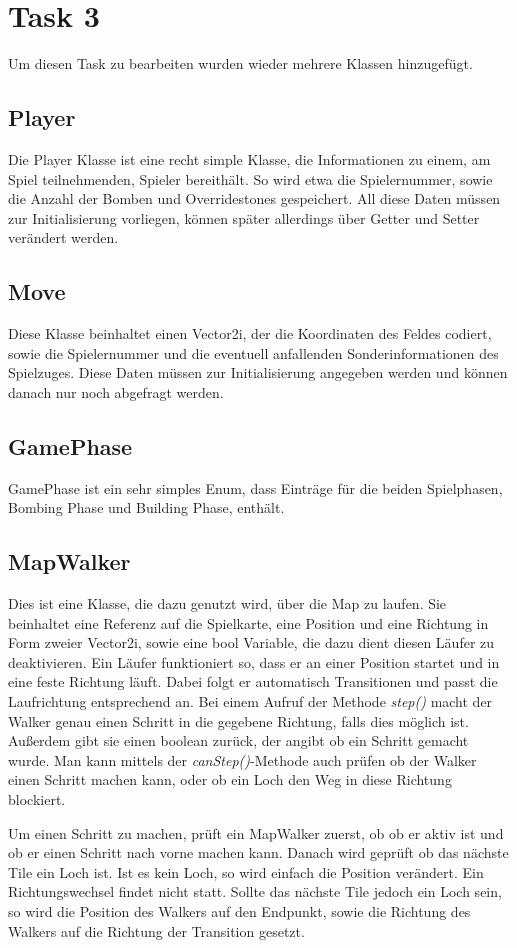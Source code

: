 \section{Task 3}
Um diesen Task zu bearbeiten wurden wieder mehrere Klassen hinzugefügt.
\subsection{Player}
\label{PLayer}
Die Player Klasse ist eine recht simple Klasse, die Informationen zu einem, am Spiel teilnehmenden, Spieler bereithält. So wird etwa die Spielernummer, sowie die Anzahl der Bomben und Overridestones gespeichert. All diese Daten müssen zur Initialisierung vorliegen, können später allerdings über Getter und Setter verändert werden.
\subsection{Move}
\label{Move}
Diese Klasse beinhaltet einen Vector2i, der die Koordinaten des Feldes codiert, sowie die Spielernummer und die eventuell anfallenden Sonderinformationen des Spielzuges. Diese Daten müssen zur Initialisierung angegeben werden und können danach nur noch abgefragt werden.
\subsection{GamePhase}
\label{GamePhase}
GamePhase ist ein sehr simples Enum, dass Einträge für die beiden Spielphasen, Bombing Phase und Building Phase, enthält.
\subsection{MapWalker}
\label{MapWalker}
Dies ist eine Klasse, die dazu genutzt wird, über die Map zu laufen. Sie beinhaltet eine Referenz auf die Spielkarte, eine Position und eine Richtung in Form zweier Vector2i, sowie eine bool Variable, die dazu dient diesen Läufer zu deaktivieren.
Ein Läufer funktioniert so, dass er an einer Position startet und in eine feste Richtung läuft. Dabei folgt er automatisch Transitionen und passt die Laufrichtung entsprechend an. Bei einem Aufruf der Methode \textit{step()} macht der Walker genau einen Schritt in die gegebene Richtung, falls dies möglich ist. Außerdem gibt sie einen boolean zurück, der angibt ob ein Schritt gemacht wurde. Man kann mittels der \textit{canStep()}-Methode auch prüfen ob der Walker einen Schritt machen kann, oder ob ein Loch den Weg in diese Richtung blockiert.

Um einen Schritt zu machen, prüft ein MapWalker zuerst, ob ob er aktiv ist und ob er einen Schritt nach vorne machen kann. Danach wird geprüft ob das nächste Tile ein Loch ist. Ist es kein Loch, so wird einfach die Position verändert. Ein Richtungswechsel findet nicht statt. Sollte das nächste Tile jedoch ein Loch sein, so wird die Position des Walkers auf den Endpunkt, sowie die Richtung des Walkers auf die Richtung der Transition gesetzt.

